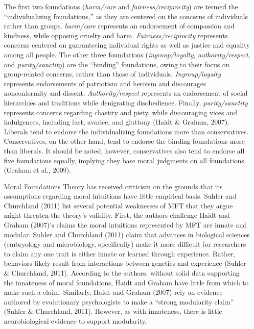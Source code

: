 \documentclass[english,,man]{apa6}
\begin{document}
The first two foundations (\emph{harm/care} and
\emph{fairness/reciprocity}) are termed the \enquote{individualizing
foundations,} as they are centered on the concerns of individuals rather
than groups. \emph{harm/care} represents an endorsement of compassion
and kindness, while opposing cruelty and harm.
\emph{Fairness/reciprocity} represents concerns centered on guaranteeing
individual rights as well as justice and equality among all people. The
other three foundations (\emph{ingroup/loyalty},
\emph{authority/respect}, and \emph{purity/sanctity}) are the
\enquote{binding} foundations, owing to their focus on group-related
concerns, rather than those of individuals. \emph{Ingroup/loyalty}
represents endorsements of patriotism and heroism and discourages
nonconformity and dissent. \emph{Authority/respect} represents an
endorsement of social hierarchies and traditions while denigrating
disobedience. Finally, \emph{purity/sanctity} represents concerns
regarding chastity and piety, while discouraging vices and indulgences,
including lust, avarice, and gluttony (Haidt \& Graham, 2007). Liberals
tend to endorse the individualizing foundations more than conservatives.
Conservatives, on the other hand, tend to endorse the binding
foundations more than liberals. It should be noted, however,
conservatives also tend to endorse all five foundations equally,
implying they base moral judgments on all foundations (Graham et al.,
2009).

Moral Foundations Theory has received criticism on the grounds that its
assumptions regarding moral intuitions have little empirical basis.
Suhler and Churchland (2011) list several potential weaknesses of MFT
that they argue might threaten the theory's validity. First, the authors
challenge Haidt and Graham (2007)'s claims the moral intuitions
represented by MFT are innate and modular. Suhler and Churchland (2011)
claim that advances in biological sciences (embryology and microbiology,
specifically) make it more difficult for researchers to claim any one
trait is either innate or learned through experience. Rather, behaviors
likely result from interactions between genetics and experience (Suhler
\& Churchland, 2011). According to the authors, without solid data
supporting the innateness of moral foundations, Haidt and Graham have
little from which to make such a claim. Similarly, Haidt and Graham
(2007) rely on evidence authored by evolutionary psychologists to make a
\enquote{strong modularity claim} (Suhler \& Churchland, 2011). However,
as with innateness, there is little neurobiological evidence to support
modularity.
\end{document}
